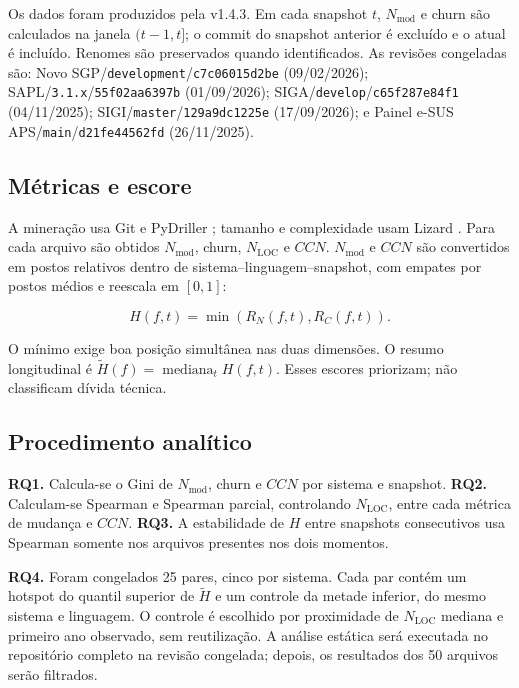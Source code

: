 \documentclass[12pt]{article}
\newcommand{\Nmod}{\ensuremath{N_{\mathrm{mod}}}}
\newcommand{\NLOC}{\ensuremath{N_{\mathrm{LOC}}}}
\newcommand{\CCN}{\ensuremath{CCN}}
\begin{document}
Os dados foram produzidos pela v1.4.3. Em cada snapshot $t$, \Nmod{} e churn são calculados na janela $(t-1,t]$; o commit do snapshot anterior é excluído e o atual é incluído. Renomes são preservados quando identificados. As revisões congeladas são: Novo SGP/\texttt{development}/\texttt{c7c06015d2be} (09/02/2026); SAPL/\texttt{3.1.x}/\texttt{55f02aa6397b} (01/09/2026); SIGA/\texttt{develop}/\texttt{c65f287e84f1} (04/11/2025); SIGI/\texttt{master}/\texttt{129a9dc1225e} (17/09/2026); e Painel e-SUS APS/\texttt{main}/\texttt{d21fe44562fd} (26/11/2025).

\subsection{Métricas e escore}

A mineração usa Git e PyDriller \cite{pydriller}; tamanho e complexidade usam Lizard \cite{lizard}. Para cada arquivo são obtidos \Nmod{}, churn, \NLOC{} e \CCN{}. \Nmod{} e \CCN{} são convertidos em postos relativos dentro de sistema--linguagem--snapshot, com empates por postos médios e reescala em $[0,1]$:

\begin{equation}H(f,t)=\min\left(R_N(f,t),R_C(f,t)\right).\end{equation}

O mínimo exige boa posição simultânea nas duas dimensões. O resumo longitudinal é $\widetilde H(f)=\operatorname{mediana}_t H(f,t)$. Esses escores priorizam; não classificam dívida técnica.

\subsection{Procedimento analítico}

\textbf{RQ1.} Calcula-se o Gini de \Nmod{}, churn e \CCN{} por sistema e snapshot. \textbf{RQ2.} Calculam-se Spearman e Spearman parcial, controlando \NLOC{}, entre cada métrica de mudança e \CCN{}. \textbf{RQ3.} A estabilidade de $H$ entre snapshots consecutivos usa Spearman somente nos arquivos presentes nos dois momentos.

\textbf{RQ4.} Foram congelados 25 pares, cinco por sistema. Cada par contém um hotspot do quantil superior de $\widetilde H$ e um controle da metade inferior, do mesmo sistema e linguagem. O controle é escolhido por proximidade de \NLOC{} mediana e primeiro ano observado, sem reutilização. A análise estática será executada no repositório completo na revisão congelada; depois, os resultados dos 50 arquivos serão filtrados.
\end{document}
